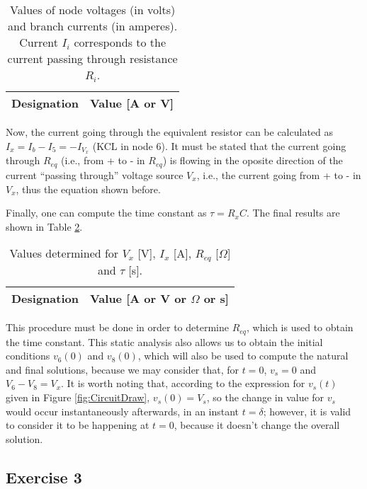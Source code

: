 \begin{table}[H]
  \centering
  \begin{tabular}{|c|c|}
    \hline
        {\bf Designation} & {\bf Value [A or V]} \\ \hline
        
  \end{tabular}
  \caption{Values of node voltages (in volts) and branch currents (in amperes). Current $I_i$ corresponds to the current passing through resistance $R_i$.}
  \label{tab:Exercise2Theoretical}
\end{table}

Now, the current going through the equivalent resistor can be calculated as $I_x=I_b-I_5=-I_{V_x}$ (KCL in node 6). It must be stated that the current going through $R_{eq}$ (i.e., from + to - in $R_{eq}$) is flowing in the oposite direction of the current ``passing through'' voltage source $V_x$, i.e., the current going from + to - in $V_x$, thus the equation shown before.
\par
Finally, one can compute the time constant as $\tau=R_xC$. The final results are shown in Table \ref{tab:Exercise2_1Theoretical}.

\begin{table}[H]
  \centering
  \begin{tabular}{|c|c|}
    \hline
        {\bf Designation} & {\bf Value [A or V or $\Omega$ or s]} \\ \hline
        
  \end{tabular}
  \caption{Values determined for $V_x$ [V], $I_x$ [A], $R_{eq}$ [$\Omega$] and $\tau$ [s].}
  \label{tab:Exercise2_1Theoretical}
\end{table}

This procedure must be done in order to determine $R_{eq}$, which is used to obtain the time constant. This static analysis also allows us to obtain the initial conditions $v_6(0)$ and $v_8(0)$, which will also be used to compute the natural and final solutions, because we may consider that, for $t=0$, $v_s=0$ and $V_6-V_8=V_x$. It is worth noting that, according to the expression for $v_s(t)$ given in Figure \ref{fig:CircuitDraw}, $v_s(0)=V_s$, so the change in value for $v_s$ would occur instantaneously afterwards, in an instant $t=\delta$; however, it is valid to consider it to be happening at $t=0$, because it doesn't change the overall solution.

\subsection{Exercise 3} \label{sec:Ex3Theo}

